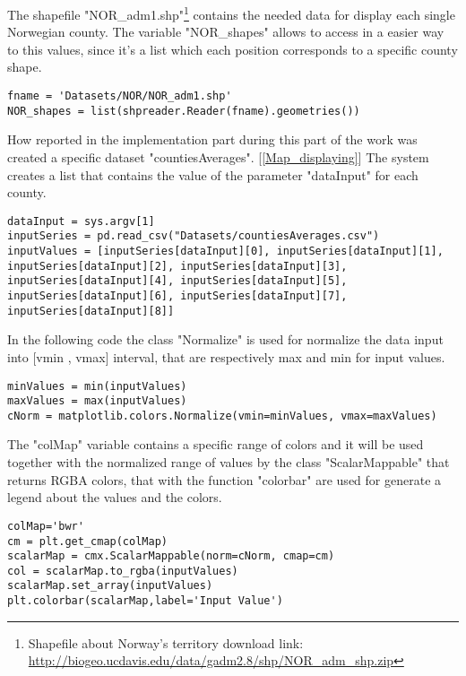 The shapefile "NOR\_adm1.shp"\footnote{Shapefile about Norway's territory download link: \\ \url{http://biogeo.ucdavis.edu/data/gadm2.8/shp/NOR\_adm\_shp.zip}} contains the needed data for display each single Norwegian county. The variable "NOR\_shapes" allows to access in a easier way to this values, since it's a list which each position corresponds to a specific county shape.
\begin{lstlisting}
fname = 'Datasets/NOR/NOR_adm1.shp'
NOR_shapes = list(shpreader.Reader(fname).geometries())
\end{lstlisting}

How reported in the implementation part during this part of the work was created a specific dataset "countiesAverages". [\ref{Map_displaying}] The system creates a list that contains the value of the parameter "dataInput" for each county.
\begin{lstlisting}
dataInput = sys.argv[1]
inputSeries = pd.read_csv("Datasets/countiesAverages.csv")
inputValues = [inputSeries[dataInput][0], inputSeries[dataInput][1], inputSeries[dataInput][2], inputSeries[dataInput][3], inputSeries[dataInput][4], inputSeries[dataInput][5], inputSeries[dataInput][6], inputSeries[dataInput][7], inputSeries[dataInput][8]]
\end{lstlisting}

In the following code the class "Normalize" is used for normalize the data input into [vmin , vmax] interval, that are respectively max and min for input values. 
\begin{lstlisting}
minValues = min(inputValues)
maxValues = max(inputValues)
cNorm = matplotlib.colors.Normalize(vmin=minValues, vmax=maxValues)
\end{lstlisting}

\newpage

The "colMap" variable contains a specific range of colors and it will be used together with the normalized range of values by the class "ScalarMappable" that returns RGBA colors, that with the function "colorbar" are used for generate a legend about the values and the colors.
\begin{lstlisting}
colMap='bwr'
cm = plt.get_cmap(colMap)
scalarMap = cmx.ScalarMappable(norm=cNorm, cmap=cm)	
col = scalarMap.to_rgba(inputValues)	
scalarMap.set_array(inputValues)
plt.colorbar(scalarMap,label='Input Value')
\end{lstlisting}

